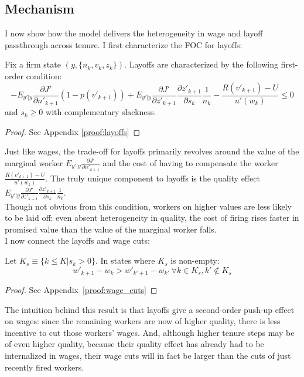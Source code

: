 \subsection{Mechanism}
I now show how the model delivers the heterogeneity in wage and layoff passthrough across tenure. 
I first characterize the FOC for layoffs:
\begin{proposition} \label{prop:layoffs}
  Fix a firm state $(y,\{n_k,v_k,z_k\})$. Layoffs are characterized by the following first-order condition:
  \begin{equation}
    -E_{y'|y}\frac{\partial J'}{\partial n'_{k+1}}(1-p(v'_{k+1}))+E_{y'|y}\frac{\partial J'}{\partial z'_{k+1}}\frac{\partial z'_{k+1}}{\partial s_k}\frac{1}{n_k} - \frac{R(v'_{k+1})-U}{u'(w_k)}\leq 0
  \end{equation}
  and $s_k \geq 0$ with complementary slackness.
\end{proposition}
\begin{proof}
  See Appendix \ref{proof:layoffs}
\end{proof}
Just like wages, the trade-off for layoffs primarily revolves around the value of the marginal worker $E_{y'|y}\frac{\partial J'}{\partial n'_{k+1}}$ and the cost of having to compensate the worker $\frac{R(v'_{k+1})-U}{u'(w_k)}$. The truly unique component to layoffs is the quality effect $E_{y'|y}\frac{\partial J'}{\partial z'_{k+1}}\frac{\partial z'_{k+1}}{\partial s_k}\frac{1}{n_k}$. \\
Though not obvious from this condition, workers on higher values are less likely to be laid off: even absent heterogeneity in quality, the cost of firing rises faster in promised value than the value of the marginal worker falls. \\
I now connect the layoffs and wage cuts:
\begin{proposition} \label{prop:wage_cuts}
Let $K_s\equiv \{k\leq K|s_k>0\}$. In states where $K_s$ is non-empty:
  \[w'_{k+1}-w_k>w'_{k'+1}-w_{k'} \: \forall k\in K_s,k'\notin K_s\]
\end{proposition}
\begin{proof}
See Appendix~\ref{proof:wage_cuts}
\end{proof}
The intuition behind this result is that layoffs give a second-order push-up effect on wages: since the remaining workers are now of higher quality, there is less incentive to cut those workers' wages. And, although higher tenure steps may be of even higher quality, because their quality effect has already had to be internalized in wages, their wage cuts will in fact be larger than the cuts of just recently fired workers.